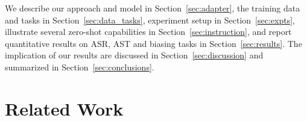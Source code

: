 We describe our approach and model in Section~\ref{sec:adapter}, the training data and tasks in Section~\ref{sec:data_tasks}, experiment setup in Section~\ref{sec:expts}, illustrate several zero-shot capabilities in Section~\ref{sec:instruction}, and report quantitative results on ASR, AST and biasing tasks in Section~\ref{sec:results}. The implication of our results are discussed in Section~\ref{sec:discussion} and summarized in Section~\ref{sec:conclusions}.


\section{Related Work}

